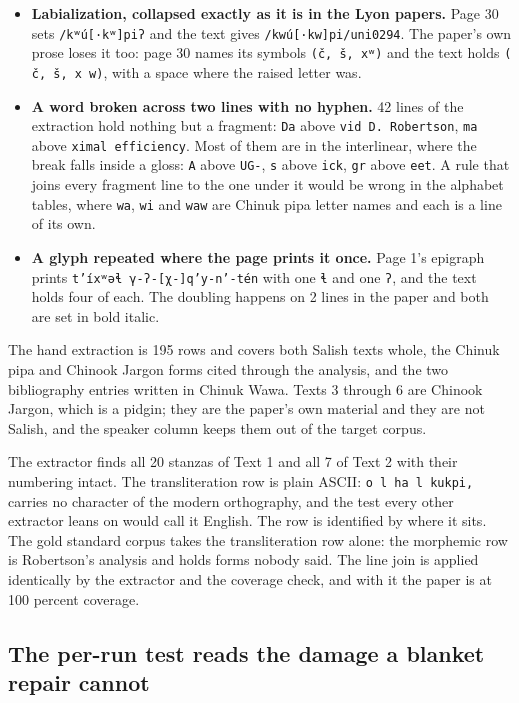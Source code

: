 \begin{itemize}
\item \textbf{Labialization, collapsed exactly as it is in the Lyon papers.} Page 30 sets \texttt{/kʷú[·kʷ]piʔ} and the text gives \texttt{/kwú[·kw]pi/uni0294}. The paper's own prose loses it too: page 30 names its symbols \texttt{(č, š, xʷ)} and the text holds \texttt{( č, š, x w)}, with a space where the raised letter was.
\item \textbf{A word broken across two lines with no hyphen.} 42 lines of the extraction hold nothing but a fragment: \texttt{Da} above \texttt{vid D. Robertson}, \texttt{ma} above \texttt{ximal efficiency}. Most of them are in the interlinear, where the break falls inside a gloss: \texttt{A} above \texttt{UG-}, \texttt{s} above \texttt{ick}, \texttt{gr} above \texttt{eet}. A rule that joins every fragment line to the one under it would be wrong in the alphabet tables, where \texttt{wa}, \texttt{wi} and \texttt{waw} are Chinuk pipa letter names and each is a line of its own.
\item \textbf{A glyph repeated where the page prints it once.} Page 1's epigraph prints \texttt{t’íxʷəɬ γ-ʔ-[χ-]q’y-n’-tén} with one \texttt{ɬ} and one \texttt{ʔ}, and the text holds four of each. The doubling happens on 2 lines in the paper and both are set in bold italic.
\end{itemize}

The hand extraction is 195 rows and covers both Salish texts whole, the Chinuk pipa and Chinook Jargon forms cited through the analysis, and the two bibliography entries written in Chinuk Wawa. Texts 3 through 6 are Chinook Jargon, which is a pidgin; they are the paper's own material and they are not Salish, and the speaker column keeps them out of the target corpus.

The extractor finds all 20 stanzas of Text 1 and all 7 of Text 2 with their numbering intact. The transliteration row is plain ASCII: \texttt{o l ha l kukpi,} carries no character of the modern orthography, and the test every other extractor leans on would call it English. The row is identified by where it sits. The gold standard corpus takes the transliteration row alone: the morphemic row is Robertson's analysis and holds forms nobody said. The line join is applied identically by the extractor and the coverage check, and with it the paper is at 100 percent coverage.

\subsection{The per-run test reads the damage a blanket repair cannot}

